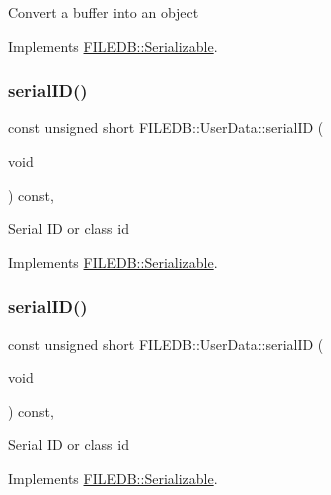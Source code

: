 Convert a buffer into an object 

Implements \mbox{\hyperlink{classFILEDB_1_1Serializable_a21a5831fa4f65790490a8a5eba9fcab2}{F\+I\+L\+E\+D\+B\+::\+Serializable}}.

\mbox{\label{classFILEDB_1_1UserData_a2d1cee48b497ef3f25957ecb1464b7f5}} 
\subsubsection{\texorpdfstring{serialID()}{serialID()}\hspace{0.1cm}{\footnotesize\ttfamily [1/3]}}
{\footnotesize\ttfamily const unsigned short F\+I\+L\+E\+D\+B\+::\+User\+Data\+::serial\+ID (\begin{DoxyParamCaption}\item[{void}]{ }\end{DoxyParamCaption}) const\hspace{0.3cm}{\ttfamily [inline]}, {\ttfamily [virtual]}}

Serial ID or class id 

Implements \mbox{\hyperlink{classFILEDB_1_1Serializable_a5d639b5dbd5d8ebc7dca1eca31bbc868}{F\+I\+L\+E\+D\+B\+::\+Serializable}}.

\mbox{\label{classFILEDB_1_1UserData_a2d1cee48b497ef3f25957ecb1464b7f5}} 
\subsubsection{\texorpdfstring{serialID()}{serialID()}\hspace{0.1cm}{\footnotesize\ttfamily [2/3]}}
{\footnotesize\ttfamily const unsigned short F\+I\+L\+E\+D\+B\+::\+User\+Data\+::serial\+ID (\begin{DoxyParamCaption}\item[{void}]{ }\end{DoxyParamCaption}) const\hspace{0.3cm}{\ttfamily [inline]}, {\ttfamily [virtual]}}

Serial ID or class id 

Implements \mbox{\hyperlink{classFILEDB_1_1Serializable_a5d639b5dbd5d8ebc7dca1eca31bbc868}{F\+I\+L\+E\+D\+B\+::\+Serializable}}.

